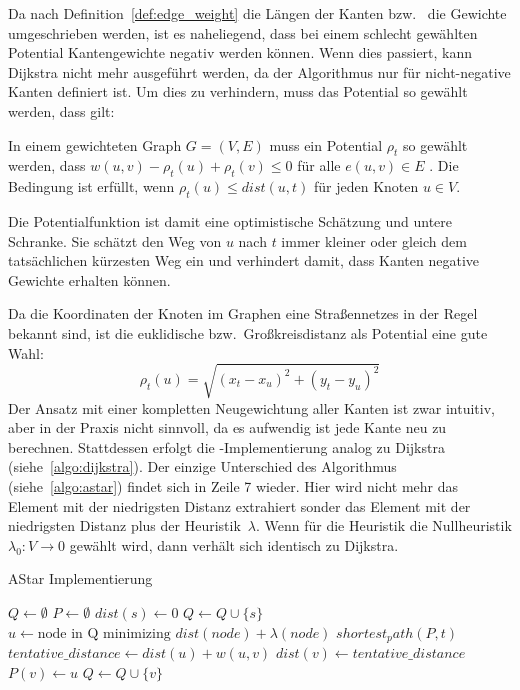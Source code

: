 Da nach Definition~\ref{def:edge_weight} die Längen der Kanten bzw.~ die Gewichte umgeschrieben
werden, ist es naheliegend, dass bei einem schlecht gewählten Potential Kantengewichte negativ
werden können. Wenn dies passiert, kann Dijkstra nicht mehr ausgeführt werden, da der Algorithmus
nur für nicht-negative Kanten definiert ist. Um dies zu verhindern, muss das Potential so gewählt
werden, dass gilt:
\begin{definition}
    In einem gewichteten Graph $G=(V,E)$ muss ein Potential $\rho_t$ so gewählt werden, dass
    $w(u,v) - \rho_t(u) + \rho_t (v) \le 0$ für alle $e(u,v) \in E$ . Die Bedingung ist erfüllt, wenn
    ${\rho_t (u) \le dist(u,t)}$ für jeden Knoten $u \in V$.
\end{definition}
Die Potentialfunktion ist damit eine optimistische Schätzung und untere Schranke. Sie schätzt den
Weg von $u$ nach $t$ immer kleiner oder gleich dem tatsächlichen kürzesten Weg ein und verhindert
damit, dass Kanten negative Gewichte erhalten können.

Da die Koordinaten der Knoten im Graphen eine Straßennetzes in der Regel bekannt sind, ist die
euklidische bzw.~Großkreisdistanz als Potential eine gute Wahl:
\begin{equation}
    \rho_t(u) = \sqrt{(x_t - x_u)^2 + (y_t - y_u)^2}
\end{equation}
Der Ansatz mit einer kompletten Neugewichtung aller Kanten ist zwar intuitiv, aber in der Praxis
nicht sinnvoll, da es aufwendig ist jede Kante neu zu berechnen. Stattdessen erfolgt die
\astar-Implementierung analog zu Dijkstra (siehe~\ref{algo:dijkstra}). Der einzige Unterschied des
Algorithmus (siehe~\ref{algo:astar}) findet sich in Zeile 7 wieder. Hier wird nicht mehr das Element
mit der niedrigsten Distanz extrahiert sonder das Element mit der niedrigsten Distanz plus der
Heuristik~$\lambda$. Wenn für die Heuristik die Nullheuristik $\lambda_0:V \rightarrow 0$ gewählt
wird, dann verhält sich \astar identisch zu Dijkstra.\\
\begin{algorithm}[h]
    \caption{AStar Implementierung}
    \label{algo:astar}
    \begin{algorithmic}[1]
        \State $Q \gets \emptyset$
        \State $P \gets \emptyset$ 
        \State $dist(s) \gets 0$
        \State $Q \gets Q \cup \{s\}$
        \State $u \gets \text{node in Q minimizing } dist(node) + \lambda(node)$ 
        \State \Return $shortest_path(P,t)$
        \EndIf
        \State $tentative\_distance \gets dist(u) + w(u,v)$
        \State $dist(v) \gets tentative\_distance$
        \State $P(v) \gets u$
        \State $Q \gets Q \cup \{v\}$
        \EndIf
        \EndFor
        \EndWhile
        \EndFunction
    \end{algorithmic}
\end{algorithm}

